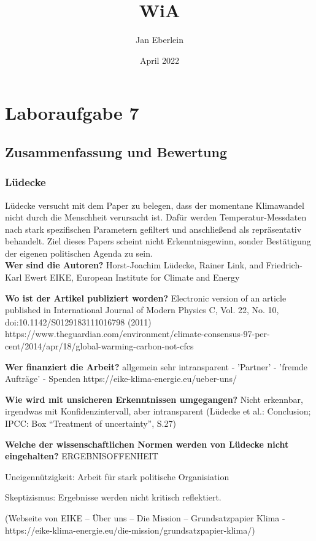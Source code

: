 \documentclass{article}
\title{WiA}
\author{Jan Eberlein}
\date{April 2022}
\begin{document}
\maketitle

\section{Laboraufgabe 7}

\subsection{Zusammenfassung und Bewertung}
\subsubsection*{Lüdecke}
Lüdecke versucht mit dem Paper zu belegen, dass der momentane Klimawandel nicht durch die Menschheit verursacht ist.
Dafür werden Temperatur-Messdaten nach stark spezifischen Parametern gefiltert und anschließend als repräsentativ behandelt.
Ziel dieses Papers scheint nicht Erkenntnisgewinn, sonder Bestätigung der eigenen politischen Agenda zu sein.
\\

\textbf{Wer sind die Autoren?}
Horst-Joachim Lüdecke, Rainer Link, and Friedrich-Karl Ewert
EIKE, European Institute for Climate and Energy

\textbf{Wo ist der Artikel publiziert worden?}
Electronic version of an article published in International Journal of Modern Physics
C, Vol. 22, No. 10, doi:10.1142/S0129183111016798 (2011)
https://www.theguardian.com/environment/climate-consensus-97-per-cent/2014/apr/18/global-warming-carbon-not-cfcs

\textbf{Wer finanziert die Arbeit?}
allgemein sehr intransparent
- 'Partner'
- 'fremde Aufträge'
- Spenden 
https://eike-klima-energie.eu/ueber-uns/

\textbf{Wie wird mit unsicheren Erkenntnissen umgegangen?}
Nicht erkennbar, irgendwas mit Konfidenzintervall, aber intransparent
(Lüdecke et al.: Conclusion; IPCC: Box “Treatment of uncertainty”, S.27)

\textbf{Welche der wissenschaftlichen Normen werden von Lüdecke nicht eingehalten?}
ERGEBNISOFFENHEIT

Uneigennützigkeit: Arbeit für stark politische Organisiation

Skeptizismus: Ergebnisse werden nicht kritisch reflektiert.

(Webseite von EIKE – Über uns – Die Mission – Grundsatzpapier Klima -
https://eike-klima-energie.eu/die-mission/grundsatzpapier-klima/)
\end{document}
